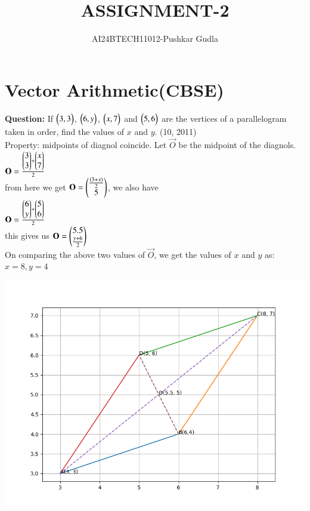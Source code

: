 \documentclass[journal,12pt,onecolumn]{IEEEtran}
\theoremstyle{remark}
\begin{document}

\vspace{3cm}

\title{ASSIGNMENT-2}
\author{AI24BTECH11012-Pushkar Gudla}
\maketitle
\bigskip
\section*{\textbf{Vector Arithmetic(CBSE)}}

\textbf{Question:} If $\begin{pmatrix}3,3\end{pmatrix}$, $\begin{pmatrix}6,y\end{pmatrix}$, $\begin{pmatrix}x,7\end{pmatrix}$ and $\begin{pmatrix}5,6\end{pmatrix}$ are the vertices of a parallelogram taken in order, find the values of $x$ and $y$. 
		\hfill{(10, 2011)}\\

		\solution Property: midpoints of diagnol coincide. Let $\vec{O}$ be the midpoint of the diagnols.\\

		$\mathbf{O}=\frac{\begin{pmatrix}3\\3\end{pmatrix}+\begin{pmatrix}x\\7\end{pmatrix}}{2}$\\
		from here we get $\mathbf{O}=\begin{pmatrix}\frac{(3+x)}{2} \\ 5\end{pmatrix}$, we also have\\
		$\mathbf{O}=\frac{\begin{pmatrix}6\\y\end{pmatrix}+\begin{pmatrix}5\\6\end{pmatrix}}{2}$\\
		this gives us $\mathbf{O}=\begin{pmatrix}5.5\\\frac{y+6}{2}\end{pmatrix}$\\
		On comparing the above two values of $\vec{O}$, we get the values of $x$ and $y$ as:\\
		$x=8, y=4$\\
\graphicspath{ {./figs/} }
		\includegraphics[scale=0.7]{parallelogram}
\end{document}
